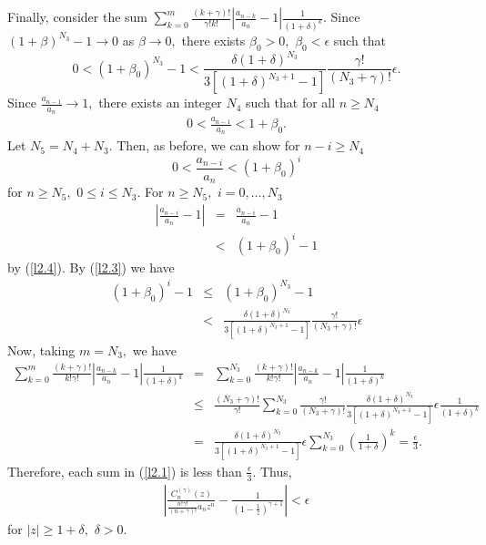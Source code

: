 \documentclass[final]{siamltex}
\begin{document}
 Finally, consider the sum $\sum_{k=0}^{m} \frac{(k+\gamma)!}{\gamma!k!} \left| \frac{a_{n-k}}{a_{n}} - 1 \right| \frac{1}{(1+\delta)^{k}}.$ 
  Since $(1+\beta)^{ N_{3}} - 1 \rightarrow 0$ as $\beta \rightarrow 0,$    there exists $\beta_{0} > 0,$ $\beta_{0} < \epsilon$ such that
  \begin{equation} 
\label{l2.3}
0 < (1+\beta_{0})^{ N_{3}} - 1 < \frac{ \delta (1+\delta)^{ N_{3}} }{ 3\left[ (1+\delta)^{ N_{3} +1} -1 \right] } \frac{ \gamma!}{( N_{3} + \gamma)!} \epsilon.
  \end{equation}
  Since $\frac{a_{n-1}}{a_{n}} \rightarrow 1,$ there exists an integer $N_{4}$ such that for all $n \geq N_{4}$ 
  \begin{eqnarray*} 0 < \frac{a_{n-1}}{a_{n}} < 1 + \beta_{0}. 
  \end{eqnarray*}
 Let $N_{5} = N_{4} + N_{3}.$ Then, as before, we can show  for $n-i \geq N_4$
\begin{equation}
\label{l2.4}
0 < \frac{a_{n-i}}{a_{n}} < (1+\beta_{0})^{i} 
\end{equation}  
for $n \geq N_{5},$ $ 0 \leq i \leq N_{3}.$
For $n \geq N_{5},$ $i = 0, \ldots, N_{3}$
 \begin{eqnarray*} \left| \frac{a_{n-i}}{a_{n}} - 1 \right| & = & \frac{a_{n-i}}{a_{n}} - 1 \\
 & < & (1 + \beta_{0})^{i} - 1   
 \end{eqnarray*}
  by (\ref{l2.4}). By (\ref{l2.3}) we have
  \begin{eqnarray*}
  (1+\beta_{0})^{i}-1 & \leq & (1+ \beta_{0})^{N_{3}} -1  \\
  & < & \frac{ \delta (1+\delta)^{ N_{3}} }{ 3\left[ (1+\delta)^{ N_{3} +1} -1 \right] }\frac{ \gamma!}{ (N_{3} + \gamma)!} \epsilon  
  \end{eqnarray*}
  Now, taking $m = N_{3},$ we have 
 \begin{eqnarray*} \sum_{k=0}^{m} \frac{(k+\gamma)!}{k!\gamma!} \left| \frac{a_{n-k}}{a_{n}} -1 \right| \frac{1}{(1+\delta)^{k}} & = & \sum_{k=0}^{N_{3}} \frac{(k+\gamma)!}{k!\gamma!} \left| \frac{a_{n-k}}{a_{n}} -1 \right| \frac{1}{(1+\delta)^{k}} \\
  & \leq & \frac{ (N_{3}+\gamma)!}{\gamma!} \sum_{k=0}^{N_{3}} \frac{\gamma!}{(N_{3}+\gamma)!} \frac{\delta (1+\delta)^{N_{3}}}{3\left[ (1+\delta)^{N_{3}+1} -1 \right]} \epsilon \frac{1}{(1+\delta)^{k}} \\
  & = & \frac{\delta (1+\delta)^{N_{3}}}{3\left[ (1+\delta)^{N_{3}+1} -1 \right] }\epsilon  \sum_{k=0}^{N_{3}} \left( \frac{1}{1+\delta} \right) ^{k} =  \frac{\epsilon}{3}.
  \end{eqnarray*}
 Therefore, each sum in (\ref{l2.1}) is less than $\frac{\epsilon}{3}.$ Thus,
 \begin{eqnarray*} \left| \frac{ C_{n}^{(\gamma)}(z) }{ \frac{n!\gamma!}{(n+\gamma)!} a_{n}z^{n} } - \frac{1}{(1 - \frac{1}{z})^{\gamma+1} } \right| < \epsilon 
 \end{eqnarray*}
  for $|z| \geq 1 + \delta,$ $\delta > 0.$  
 
\end{document}
